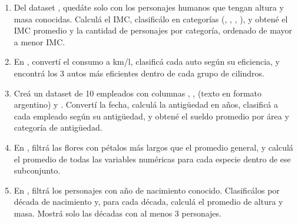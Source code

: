 \documentclass[8pt]{beamer}
\begin{document}
	\begin{frame}[fragile]
		\begin{enumerate}[start=25]
			\item Del dataset , quedáte solo con los personajes humanos que tengan altura y masa conocidas. Calculá el IMC, clasificálo en categorías (, , , ), y obtené el IMC promedio y la cantidad de personajes por categoría, ordenado de mayor a menor IMC.

			\item En , convertí el consumo a km/l, clasificá cada auto según su eficiencia, y encontrá los 3 autos más eficientes dentro de cada grupo de cilindros.

			\item Creá un dataset de 10 empleados con columnas , ,  (texto en formato argentino) y . Convertí la fecha, calculá la antigüedad en años, clasificá a cada empleado según su antigüedad, y obtené el sueldo promedio por área y categoría de antigüedad.

			\item En , filtrá las flores con pétalos más largos que el promedio general, y calculá el promedio de todas las variables numéricas para cada especie dentro de ese subconjunto.

			\item En , filtrá los personajes con año de nacimiento conocido. Clasificálos por década de nacimiento y, para cada década, calculá el promedio de altura y masa. Mostrá solo las décadas con al menos 3 personajes.
		\end{enumerate}
	\end{frame}
\end{document}
